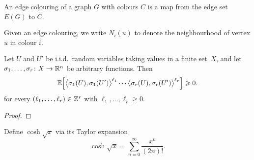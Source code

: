 %

\begin{definition}
  \label{def:edge-colouring}
  \leanok
  An edge colouring of a graph $G$ with colours $C$ is a map from the edge set $E(G)$ to $C$.
\end{definition}

\begin{definition}
  \label{def:colour-neighborhood}
  \leanok
  Given an edge colouring, we write $N_i(u)$ to denote the neighbourhood of vertex $u$ in colour $i$.
\end{definition}


\begin{lemma}
  \label{lem:moments}
  Let $U$ and\/ $U'$ be i.i.d.~random variables taking values in a finite set~$X$, and let\/ $\sigma_1,\ldots,\sigma_r \colon X \rightarrow \mathbb{R}^n$ be arbitrary functions. Then
  $$\mathbb{E}\Big[ \big\langle \sigma_1(U),\sigma_1(U') \big\rangle^{\ell_1} \cdots \big\langle \sigma_r(U),\sigma_r(U') \big\rangle^{\ell_r} \Big] \geqslant 0.$$
  for every $(\ell_1,\dots,\ell_r) \in \mathbb{Z}^r$ with $\ell_1,\dots,\ell_r \ge 0$.
\end{lemma}
\begin{proof}
\end{proof}

\begin{definition}
  \label{def:coshsqrt}
  \leanok
  Define $\cosh \sqrt{x}$ via its Taylor expansion
  $$\cosh\sqrt{x} = \sum_{n = 0}^\infty \frac{x^n}{(2n)!}.$$
\end{definition}

